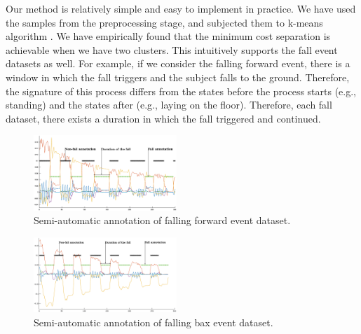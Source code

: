 \documentclass{IEEEtran}
\begin{document}
Our method is relatively simple and easy to implement in practice. We have used the 
samples from the preprocessing stage, and subjected them to k-means algorithm 
\cite{Bishop06a}. We have empirically found that the minimum cost separation is 
achievable when we have two clusters. This intuitively supports the fall event datasets 
as well. For 
example, if we consider the falling forward event, there is a window in which the fall 
triggers and the subject falls to the ground. Therefore, the signature of this process 
differs from the states before the process starts (e.g., standing) and the states after 
(e.g., laying on the floor). Therefore, each fall dataset, there exists a duration in 
which the fall triggered and continued.


\begin{figure}[!htb]
\centering
\includegraphics[width=0.48\textwidth]{plots/human_falling_forward2.eps} 
\caption{Semi-automatic annotation of falling forward event dataset.}
 \label{fig:automatic_annotation} 
\end{figure}


\begin{figure}[!htb]
\centering
\includegraphics[width=0.48\textwidth]{plots/human_falling_backward2.eps} 
\caption{Semi-automatic annotation of falling bax event dataset.}
 \label{fig:automatic_annotation2} 
\end{figure}





\end{document}
